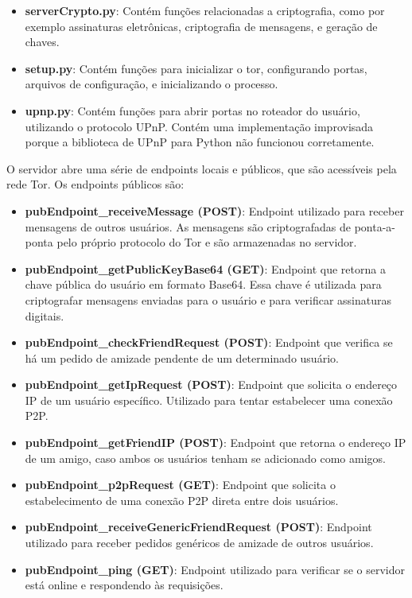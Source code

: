 \begin{itemize}
    \item \textbf{serverCrypto.py}: Contém funções relacionadas a criptografia, como por exemplo assinaturas eletrônicas, criptografia de mensagens, e geração de chaves.
    \item \textbf{setup.py}: Contém funções para inicializar o tor, configurando portas, arquivos de configuração, e inicializando o processo.
    \item \textbf{upnp.py}: Contém funções para abrir portas no roteador do usuário, utilizando o protocolo UPnP. Contém uma implementação improvisada porque a biblioteca de UPnP para Python não funcionou corretamente.
\end{itemize}

O servidor abre uma série de endpoints locais e públicos, que são acessíveis pela rede Tor. Os endpoints públicos são:

\begin{itemize}
\item \textbf{pubEndpoint\_receiveMessage (POST)}: Endpoint utilizado para receber mensagens de outros usuários. As mensagens são criptografadas de ponta-a-ponta pelo próprio protocolo do Tor e são armazenadas no servidor.
\item \textbf{pubEndpoint\_getPublicKeyBase64 (GET)}: Endpoint que retorna a chave pública do usuário em formato Base64. Essa chave é utilizada para criptografar mensagens enviadas para o usuário e para verificar assinaturas digitais.
\item \textbf{pubEndpoint\_checkFriendRequest (POST)}: Endpoint que verifica se há um pedido de amizade pendente de um determinado usuário.
\item \textbf{pubEndpoint\_getIpRequest (POST)}: Endpoint que solicita o endereço IP de um usuário específico. Utilizado para tentar estabelecer uma conexão P2P.
\item \textbf{pubEndpoint\_getFriendIP (POST)}: Endpoint que retorna o endereço IP de um amigo, caso ambos os usuários tenham se adicionado como amigos.
\item \textbf{pubEndpoint\_p2pRequest (GET)}: Endpoint que solicita o estabelecimento de uma conexão P2P direta entre dois usuários.
\item \textbf{pubEndpoint\_receiveGenericFriendRequest (POST)}: Endpoint utilizado para receber pedidos genéricos de amizade de outros usuários.
\item \textbf{pubEndpoint\_ping (GET)}: Endpoint utilizado para verificar se o servidor está online e respondendo às requisições.
\end{itemize}

